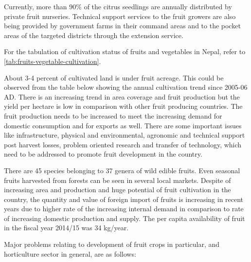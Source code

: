 \documentclass[
  openany]{book}
\begin{document}
Currently, more than 90\% of the citrus seedlings are annually distributed by private fruit nurseries. Technical support services to the fruit growers are also being provided by government farms in their command areas and to the pocket areas of the targeted districts through the extension service.

For the tabulation of cultivation status of fruits and vegetables in Nepal, refer to \ref{tab:fruits-vegetable-cultivation}.

About 3-4 percent of cultivated land is under fruit acreage. This could be observed from the table below showing the annual cultivation trend since 2005-06 AD. There is an increasing trend in area coverage and fruit production but the yield per hectare is low in comparison with other fruit producing countries. The fruit production needs to be increased to meet the increasing demand for domestic consumption and for exports as well. There are some important issues like infrastructure, physical and environmental, agronomic and technical support post harvest losses, problem oriented research and transfer of technology, which need to be addressed to promote fruit development in the country.

There are 45 species belonging to 37 genera of wild edible fruits. Even seasonal fruits harvested from forests can be seen in several local markets. Despite of increasing area and production and huge potential of fruit cultivation in the country, the quantity and value of foreign import of fruits is increasing in recent years due to higher rate of the increasing internal demand in comparison to rate of increasing domestic production and supply. The per capita availability of fruit in the fiscal year 2014/15 was 34 kg/year.

Major problems relating to development of fruit crops in particular, and horticulture sector in general, are as follows:
\end{document}
